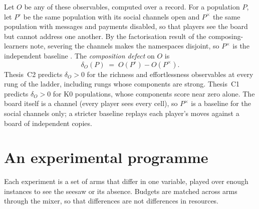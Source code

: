 \documentclass[11pt,a4paper]{article}
\begin{document}
Let $O$ be any of these observables, computed over a record. For a population $P$, let
$P^{\circ}$ be the same population with its social channels open and $P^{\times}$ the same
population with messages and payments disabled, so that players see the board but cannot address
one another. By the factorisation result of the composing-learners note, severing the channels makes
the namespaces disjoint, so $P^{\times}$ is the independent baseline \cite{rholife-compose}. The
\emph{composition defect} on $O$ is
\[
\delta_O(P) \;=\; O(P^{\circ}) - O(P^{\times}).
\]
Thesis~C2 predicts $\delta_O>0$ for the richness and effortlessness observables at every rung of
the ladder, including rungs whose components are strong. Thesis~C1 predicts $\delta_O>0$ for K0
populations, whose components score near zero alone. The board itself is a channel (every player
sees every cell), so $P^{\times}$ is a baseline for the social channels only; a stricter baseline
replays each player's moves against a board of independent copies.

\section{An experimental programme}\label{sec:programme}

Each experiment is a set of arms that differ in one variable, played over enough instances to
see the seesaw or its absence. Budgets are matched across arms through the mixer, so that
differences are not differences in resources.
\end{document}
